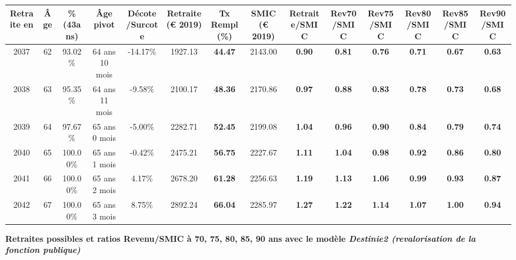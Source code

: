 \begin{adjustbox}{max width=\textwidth} 
\begin{tabular}[htb]{|c|c||c|c|c||c|c||c||c|c|c|c|c|c|} 
\hline 
 Retraite en &  Âge &  \%(43ans) &  Âge pivot &  Décote/Surcote &  Retraite (\euro{} 2019) &  Tx Rempl(\%) &  SMIC (\euro{} 2019) &  Retraite/SMIC &  Rev70/SMIC &  Rev75/SMIC &  Rev80/SMIC &  Rev85/SMIC &  Rev90/SMIC \\ 
\hline \hline 
 2037 &  62 &  93.02\% &  64 ans 10 mois &  -14.17\% &  1927.13 &  {\bf 44.47} &  2143.00 &  {\bf {\color{red} 0.90}} &  {\bf {\color{red} 0.81}} &  {\bf {\color{red} 0.76}} &  {\bf {\color{red} 0.71}} &  {\bf {\color{red} 0.67}} &  {\bf {\color{red} 0.63}} \\ 
\hline 
 2038 &  63 &  95.35\% &  64 ans 11 mois &  -9.58\% &  2100.17 &  {\bf 48.36} &  2170.86 &  {\bf {\color{red} 0.97}} &  {\bf {\color{red} 0.88}} &  {\bf {\color{red} 0.83}} &  {\bf {\color{red} 0.78}} &  {\bf {\color{red} 0.73}} &  {\bf {\color{red} 0.68}} \\ 
\hline 
 2039 &  64 &  97.67\% &  65 ans 0 mois &  -5.00\% &  2282.71 &  {\bf 52.45} &  2199.08 &  {\bf 1.04} &  {\bf {\color{red} 0.96}} &  {\bf {\color{red} 0.90}} &  {\bf {\color{red} 0.84}} &  {\bf {\color{red} 0.79}} &  {\bf {\color{red} 0.74}} \\ 
\hline 
 2040 &  65 &  100.00\% &  65 ans 1 mois &  -0.42\% &  2475.21 &  {\bf 56.75} &  2227.67 &  {\bf 1.11} &  {\bf 1.04} &  {\bf {\color{red} 0.98}} &  {\bf {\color{red} 0.92}} &  {\bf {\color{red} 0.86}} &  {\bf {\color{red} 0.80}} \\ 
\hline 
 2041 &  66 &  100.00\% &  65 ans 2 mois &  4.17\% &  2678.20 &  {\bf 61.28} &  2256.63 &  {\bf 1.19} &  {\bf 1.13} &  {\bf 1.06} &  {\bf {\color{red} 0.99}} &  {\bf {\color{red} 0.93}} &  {\bf {\color{red} 0.87}} \\ 
\hline 
 2042 &  67 &  100.00\% &  65 ans 3 mois &  8.75\% &  2892.24 &  {\bf 66.04} &  2285.97 &  {\bf 1.27} &  {\bf 1.22} &  {\bf 1.14} &  {\bf 1.07} &  {\bf 1.00} &  {\bf {\color{red} 0.94}} \\ 
\hline 
\hline 
\end{tabular} 
\end{adjustbox} 
 
 \vspace{0.1cm} 
{\bf \noindent Retraites possibles et ratios Revenu/SMIC à 70, 75, 80, 85, 90 ans avec le modèle \emph{Destinie2 (revalorisation de la fonction publique)}}  
 
